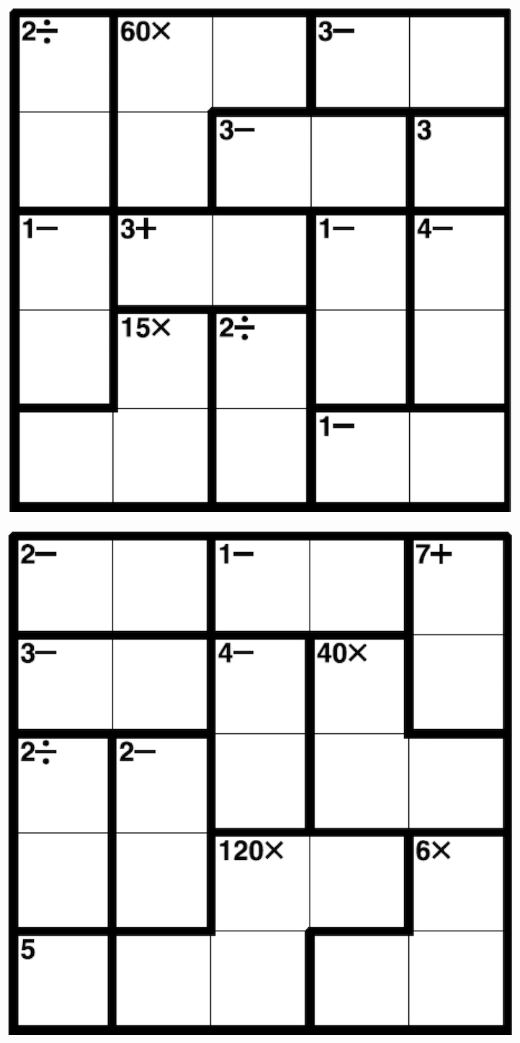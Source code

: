
\includegraphics[scale=1]{Gambar/Lampiran/5x5_5.png}

\includegraphics[scale=1]{Gambar/Lampiran/5x5_6.png}
